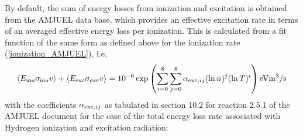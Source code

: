 \documentclass[amsmath,amssymb,a4]{revtex4-2}
\begin{document}
By default, the sum of energy losses from ionization and excitation is obtained from the AMJUEL data base, which provides an effective excitation rate in terms of an averaged effective energy loss per ionization. This is calculated from a fit function of the same form as defined above for the ionization rate (\ref{ionization_AMJUEL}), i.e.
\begin{equation}
  \langle E_{\rm ion} \sigma_{\rm ion} v\rangle + \langle E_{\rm exc} \sigma_{\rm exc} v\rangle =  10^{-6} \exp\left( \sum_{i=0}^8\sum_{j=0}^8 \alpha_{{\rm exc,} ij} (\ln \bar n)^j (\ln T)^i \right)  {\rm eV} {\rm m}^3/{\rm s}
\end{equation}
with the coefficients $\alpha_{{\rm exc,} ij}$ as tabulated in section 10.2 for reaction 2.5.1 of the AMJUEL document for the case of the total energy loss rate associated with Hydrogen ionization and excitation radiation:
\end{document}
